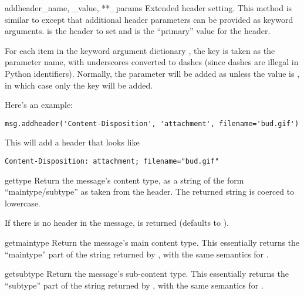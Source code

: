 \documentclass{howto}
\begin{document}
\begin{methoddesc}[Message]{addheader}{_name, _value, **_params}
Extended header setting.  This method is similar to
 except that additional header parameters can be
provided as keyword arguments.   is the header to set and
 is the ``primary'' value for the header.

For each item in the keyword argument dictionary , the
key is taken as the parameter name, with underscores converted to
dashes (since dashes are illegal in Python identifiers).  Normally,
the parameter will be added as  unless the value is
, in which case only the key will be added.

Here's an example:

\begin{verbatim}
msg.addheader('Content-Disposition', 'attachment', filename='bud.gif')
\end{verbatim}

This will add a header that looks like

\begin{verbatim}
Content-Disposition: attachment; filename="bud.gif"
\end{verbatim}
\end{methoddesc}

\begin{methoddesc}[Message]{gettype}{}
Return the message's content type, as a string of the form
``maintype/subtype'' as taken from the  header.
The returned string is coerced to lowercase.

If there is no  header in the message,
 is returned (defaults to ).
\end{methoddesc}

\begin{methoddesc}[Message]{getmaintype}{}
Return the message's main content type.  This essentially returns the
``maintype'' part of the string returned by , with the
same semantics for .
\end{methoddesc}

\begin{methoddesc}[Message]{getsubtype}{}
Return the message's sub-content type.  This essentially returns the
``subtype'' part of the string returned by , with the
same semantics for .
\end{methoddesc}
\end{document}
